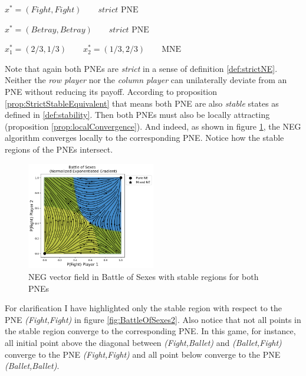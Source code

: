 \begin{description}\centering
    \item $x^{*} = (Fight,Fight) \qquad \textit{strict }\text{PNE}$
    \item $x^{*} = (Betray,Betray) \qquad \textit{strict }\text{PNE}$
    \item $x_{1}^* = (2/3,1/3) \qquad x_{2}^* = (1/3,2/3) \qquad \text{MNE}$
\end{description}

Note that again both PNEs are \textit{strict} in a sense of definition \ref{def:strictNE}. Neither the \textit{row player} nor the \textit{column player} can unilaterally deviate from an PNE without reducing its payoff. According to proposition \ref{prop:StrictStableEquivalent} that means both PNE are also \textit{stable} states as defined in \ref{def:stability}. Then both PNEs must also be locally attracting (proposition \ref{prop:localConvergence}). And indeed, as shown in figure \ref{fig:BattleOfSexes5}, the NEG algorithm converges locally to the corresponding PNE. Notice how the stable regions of the PNEs intersect. 

\begin{figure}[H]
    \centering
    \includegraphics[width=0.5\textwidth]{logos/BattleOfSexes5.png}
    \caption{NEG vector field in Battle of Sexes with stable regions for both PNEs}
    \label{fig:BattleOfSexes5}
\end{figure}

For clarification I have highlighted only the stable region with respect to the PNE \textit{(Fight,Fight)} in figure \ref{fig:BattleOfSexes2}. Also notice that not all points in the stable region converge to the corresponding PNE. In this game, for instance, all initial point above the diagonal between \textit{(Fight,Ballet)} and \textit{(Ballet,Fight)} converge to the PNE \textit{(Fight,Fight)} and all point below converge to the PNE \textit{(Ballet,Ballet)}. 

